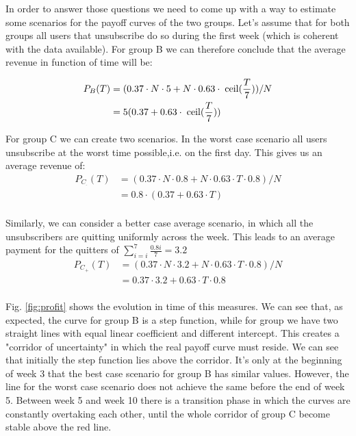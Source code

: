 \documentclass[paper=a4, fontsize=10pt]{report}
\begin{document}
In order to answer those questions we need to come up with a way to estimate some scenarios for the payoff curves of the two groups.
Let's assume that for both groups all users that unsubscribe do so during the first week (which is coherent with the data available). 
For group B we can therefore conclude that the average revenue in function of time will be:


\begin{equation}
\begin{split}
 P_{B}(T) & = (0.37 \cdot N \cdot 5 + N \cdot 0.63  \cdot  \hspace{1mm}\mathrm{ceil} (\frac{T}{7}) )/N \\
 & = 5(0.37+0.63  \cdot  \hspace{1mm}\mathrm{ceil} (\frac{T}{7})) \\
 \end{split}
\end{equation}

For group C we can create two scenarios. In the worst case scenario all users unsubscribe at the worst time possible,i.e. on the first day. This gives us an average revenue of:
\begin{equation}
\begin{split}
 P_{C_{\!^{\_}}}(T) & = (0.37 \cdot N \cdot 0.8 + N \cdot 0.63 \cdot T \cdot 0.8)/N \\
 & = 0.8 \cdot (0.37 + 0.63 \cdot T) \\
 \end{split}
\end{equation}

Similarly, we can consider a better case average scenario, in which all the unsubscribers are quitting uniformly across the week.
This leads to an average payment for the quitters of $\sum_{i=i}^{7} \frac{0.8i}{7} = 3.2$
\begin{equation}
\begin{split}
 P_{C_{+}}(T) & = (0.37 \cdot N \cdot 3.2 + N \cdot 0.63 \cdot T \cdot 0.8)/N \\
 & = 0.37 \cdot 3.2 + 0.63 \cdot T \cdot 0.8 \\
 \end{split}
\end{equation}

Fig. \ref{fig:profit} shows the evolution in time of this measures. We can see that, as expected, the curve for 
group B is a step function, while for group we have two straight lines with equal linear coefficient and different intercept. This
creates a "corridor of uncertainty" in which the real payoff curve must reside. We can see that initially
the step function lies above the corridor. It's only at the beginning of week 3 that the best case scenario 
for group B has similar values. However, the line for the worst case scenario does not achieve the same before the end
of week 5. Between week 5 and week 10 there is a transition phase in which the curves are constantly overtaking each other, until
the whole corridor of group C become stable above the red line.
\end{document}
